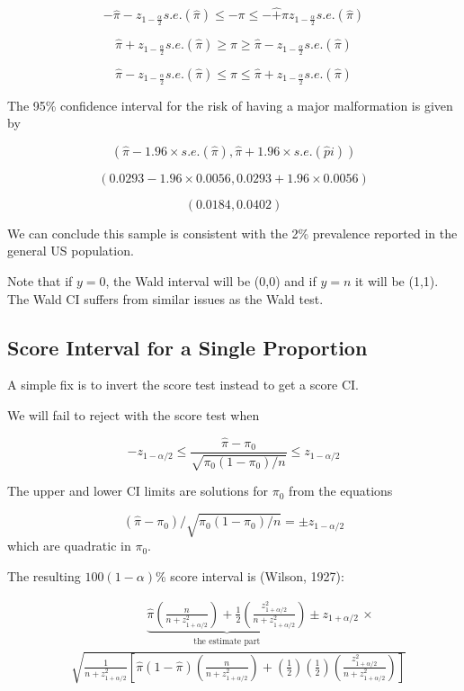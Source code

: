 \documentclass[
  letterpaper,
  DIV=11,
  numbers=noendperiod]{scrreport}
\begin{document}
\[-\hat\pi-z_{1-\frac{\alpha}{2}}s.e.(\hat \pi) \le - \pi \le -\hat + \pi z_{1-\frac{\alpha}{2}}s.e.(\hat \pi) 
\]

\[ \hat\pi+z_{1-\frac{\alpha}{2}}s.e.(\hat \pi) \ge \pi \ge \hat \pi - z_{1-\frac{\alpha}{2}}s.e.(\hat \pi) 
\]

\[ \hat\pi-z_{1-\frac{\alpha}{2}}s.e.(\hat \pi) \le \pi \le \hat \pi + z_{1-\frac{\alpha}{2}}s.e.(\hat \pi) 
\]

The 95\% confidence interval for the risk of having a major malformation
is given by

\[(\hat \pi - 1.96 \times s.e.(\hat \pi), \hat \pi + 1.96 \times s.e.(\hat pi))
\]

\[(0.0293 - 1.96 \times 0.0056, 0.0293 + 1.96 \times 0.0056)
\]

\[
(0.0184, 0.0402)
\]

We can conclude this sample is consistent with the 2\% prevalence
reported in the general US population.

Note that if \(y = 0\), the Wald interval will be (0,0) and if \(y = n\)
it will be (1,1). The Wald CI suffers from similar issues as the Wald
test.

\hypertarget{score-interval-for-a-single-proportion}{%
\subsection{Score Interval for a Single
Proportion}\label{score-interval-for-a-single-proportion}}

A simple fix is to invert the score test instead to get a score CI.

We will fail to reject with the score test when

\[-z_{1-\alpha/2} \leq \frac{\hat \pi - \pi_0}{\sqrt{\pi_0 (1-\pi_0)/n}} \leq 
z_{1-\alpha/2}
\]

The upper and lower CI limits are solutions for \(\pi_0\) from the
equations

\[(\hat \pi - \pi_0) / \sqrt{\pi_0(1-\pi_0)/n} = \pm z_{1-\alpha/2}
\] which are quadratic in \(\pi_0\).

The resulting \(100(1-\alpha)\)\% score interval is (Wilson, 1927):

\[
\begin{aligned}
& \hspace{1in} \underbrace{\hat \pi \left( \frac{n}{n + z_{1+\alpha/2}^2} \right) + \frac{1}{2} \left( 
\frac{z_{1+\alpha/2}^2}{n + z_{1+\alpha/2}^2}\right)}_{\text{the estimate part}} \pm z_{1+\alpha/2} 
 \, \times \\ 
& \sqrt{
  \frac{1}{n + z_{1+\alpha/2}^2 } \left[ 
    \hat \pi (1 - \hat \pi) \left( \frac{n}{n + z_{1+\alpha/2}^2} \right) + 
    \left(\frac{1}{2}\right)\left(\frac{1}{2}\right) 
    \left( \frac{z_{1+\alpha/2}^2}{n + z_{1+\alpha/2}^2} \right)
  \right]
}
\end{aligned}
\]
\end{document}

